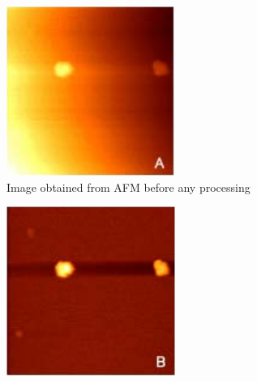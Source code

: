 \documentclass[11pt,a4paper]{article}
\begin{document}
\begin{figure}[H]
\centering
\begin{subfigure}[b]{0.3\textwidth}
\includegraphics[width=\textwidth]{artifacts_processing_1}
\caption{Image obtained from AFM before any processing}
\label{fig:artifacts_processing_1}
\end{subfigure}
\begin{subfigure}[b]{0.3\textwidth}
\includegraphics[width=\textwidth]{artifacts_processing_2}

\end{subfigure}
\end{figure}
\end{document}
